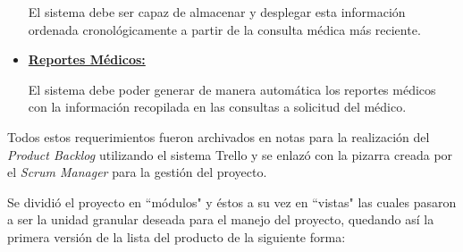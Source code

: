 \begin{itemize}
        El sistema debe ser capaz de almacenar y desplegar esta información ordenada cronológicamente a partir de la consulta médica más reciente.
        
        \item \textbf{\underline{Reportes Médicos:}}
        
        El sistema debe poder generar de manera automática los reportes médicos con la información recopilada en las consultas a solicitud del médico.
    \end{itemize}
    
    Todos estos requerimientos fueron archivados en notas para la realización del \textit{Product Backlog} utilizando el sistema Trello y se enlazó con la pizarra creada por el \textit{Scrum Manager} para la gestión del proyecto.
    
    Se dividió el proyecto en ``módulos" y éstos a su vez en ``vistas" las cuales pasaron a ser la unidad granular deseada para el manejo del proyecto, quedando así la primera versión de la lista del producto de la siguiente forma:
    
